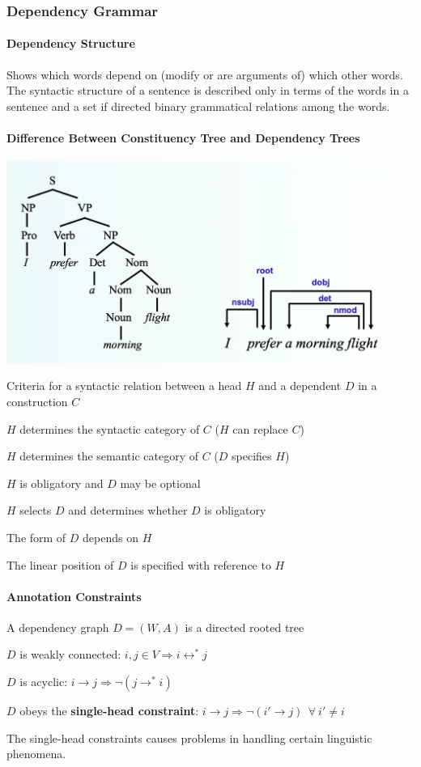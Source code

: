 \documentclass[10pt]{report}
\begin{document}
\subsubsection{Dependency Grammar}
\paragraph{Dependency Structure} Shows which words depend on (modify or are arguments of) which other words. The syntactic structure of a sentence is described only in terms of the words in a sentence and a set if directed binary grammatical relations among the words.
\paragraph{Difference Between Constituency Tree and Dependency Trees}
\begin{center}
	\includegraphics[scale=0.5]{37.png}
\end{center}
Criteria for a syntactic relation between a head $H$ and a dependent $D$ in a construction $C$
\begin{list}{}{}
	\item $H$ determines the syntactic category of $C$ ($H$ can replace $C$)
	\item $H$ determines the semantic category of $C$ ($D$ specifies $H$)
	\item $H$ is obligatory and $D$ may be optional
	\item $H$ selects $D$ and determines whether $D$ is obligatory
	\item The form of $D$ depends on $H$
	\item The linear position of $D$ is specified with reference to $H$
\end{list}
\paragraph{Annotation Constraints} A dependency graph $D = (W, A)$ is a directed rooted tree
\begin{list}{}{}
	\item $D$ is weakly connected: $i,j\in V\Rightarrow i\leftrightarrow^* j$
	\item $D$ is acyclic: $i\rightarrow j \Rightarrow \neg(j\rightarrow^* i)$
	\item $D$ obeys the \textbf{single-head constraint}: $i\rightarrow j \Rightarrow \neg(i'\rightarrow j)\:\:\forall\:i'\neq i$
\end{list}
The single-head constraints causes problems in handling certain linguistic phenomena.
\end{document}
